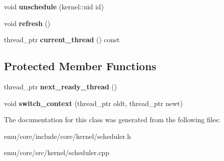 \begin{DoxyCompactItemize}
\item 
\mbox{\label{classeka2l1_1_1kernel_1_1thread__scheduler_aa714f229102f97cfa3d5e42912b4539c}} 
void {\bfseries unschedule} (kernel\+::uid id)
\item 
\mbox{\label{classeka2l1_1_1kernel_1_1thread__scheduler_a3d25743fb9b0e708b82780639fe1d188}} 
void {\bfseries refresh} ()
\item 
\mbox{\label{classeka2l1_1_1kernel_1_1thread__scheduler_a417b77ac108f78198a79423ce2a77253}} 
thread\+\_\+ptr {\bfseries current\+\_\+thread} () const
\end{DoxyCompactItemize}
\subsection*{Protected Member Functions}
\begin{DoxyCompactItemize}
\item 
\mbox{\label{classeka2l1_1_1kernel_1_1thread__scheduler_a9e240846d34e567d58757968f2a03cd3}} 
thread\+\_\+ptr {\bfseries next\+\_\+ready\+\_\+thread} ()
\item 
\mbox{\label{classeka2l1_1_1kernel_1_1thread__scheduler_aee1a6637279f85e5aa1ac94cb4560537}} 
void {\bfseries switch\+\_\+context} (thread\+\_\+ptr oldt, thread\+\_\+ptr newt)
\end{DoxyCompactItemize}


The documentation for this class was generated from the following files\+:\begin{DoxyCompactItemize}
\item 
emu/core/include/core/kernel/scheduler.\+h\item 
emu/core/src/kernel/scheduler.\+cpp\end{DoxyCompactItemize}
